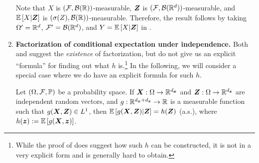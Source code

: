 \begin{enumerate}
\begin{pf}
Note that \(X\) is \((\mathcal{F},\mathcal{B}(\mathbb{R}))\)-measurable, \(\bm{Z}\)
is \((\mathcal{F},\mathcal{B}(\mathbb{R}^{d}))\)-measurable, and \(\mathbb{E}\left[X|\bm{Z}\right]\)
is \((\sigma(Z),\mathcal{B}(\mathbb{R}))\)-measurable. Therefore, the result follows by
taking \(\Omega'=\mathbb{R}^{d}\), \(\mathcal{F}'=\mathcal{B}(\mathbb{R}^{d})\), and
\(Y=\mathbb{E}\left[X|\bm{Z}\right]\) in .
\end{pf}
\item \textbf{Factorization of conditional expectation under independence.}
Both  and  suggest the
\emph{existence} of factorization, but do not give us an explicit ``formula''
for finding out what \(h\) is.\footnote{While the proof of
 does suggest how such \(h\) can be constructed,
it is not in a very explicit form and is generally hard to obtain.} In the
following, we will consider a special case where we do have an explicit formula
for such \(h\).

\begin{proposition}
\label{prp:fact-indp}
Let \((\Omega,\mathcal{F},\mathbb{P})\) be a probability space.  If
\(\bm{X}:\Omega\to\mathbb{R}^{d_{\bm{x}}}\) and
\(\bm{Z}:\Omega\to\mathbb{R}^{d_{\bm{z}}}\) are independent random vectors, and
\(g:\mathbb{R}^{d_{\bm{x}}+d_{\bm{z}}}\to\mathbb{R}\) is a measurable function such that
\(g(\bm{X},\bm{Z})\in L^{1}\), then
\(\mathbb{E}\left[g(\bm{X},\bm{Z})|\bm{Z}\right]=h(\bm{Z})\) (a.s.), where
\(h(\bm{z}):=\mathbb{E}\left[g(\bm{X},\bm{z})\right]\).
\end{proposition}


\end{enumerate}
